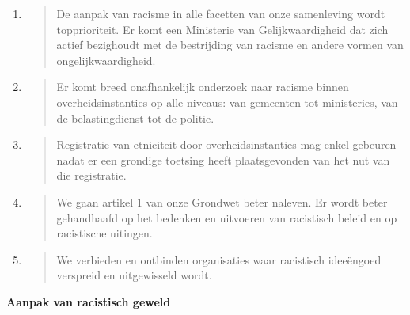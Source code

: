 \begin{enumerate}
\def\labelenumi{\arabic{enumi}.}
\item
  \begin{quote}
  De aanpak van racisme in alle facetten van onze samenleving wordt
  topprioriteit. Er komt een Ministerie van Gelijkwaardigheid dat zich
  actief bezighoudt met de bestrijding van racisme en andere vormen van
  ongelijkwaardigheid.
  \end{quote}
\item
  \begin{quote}
  Er komt breed onafhankelijk onderzoek naar racisme binnen
  overheidsinstanties op alle niveaus: van gemeenten tot ministeries,
  van de belastingdienst tot de politie.
  \end{quote}
\item
  \begin{quote}
  Registratie van etniciteit door overheidsinstanties mag enkel gebeuren
  nadat er een grondige toetsing heeft plaatsgevonden van het nut van
  die registratie.
  \end{quote}
\item
  \begin{quote}
  We gaan artikel 1 van onze Grondwet beter naleven. Er wordt beter
  gehandhaafd op het bedenken en uitvoeren van racistisch beleid en op
  racistische uitingen.
  \end{quote}
\item
  \begin{quote}
  We verbieden en ontbinden organisaties waar racistisch ideeëngoed
  verspreid en uitgewisseld wordt.
  \end{quote}
\end{enumerate}

\textbf{Aanpak van racistisch geweld}

